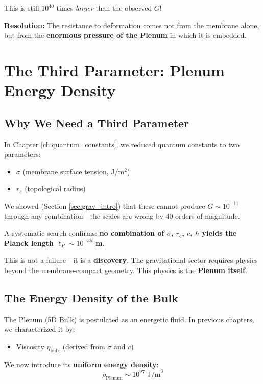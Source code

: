 This is still $10^{40}$ times \textit{larger} than the observed $G$!

\textbf{Resolution:} The resistance to deformation comes not from the membrane alone, but from the \textbf{enormous pressure of the Plenum} in which it is embedded.

\newpage

\section{The Third Parameter: Plenum Energy Density}
\label{sec:third_parameter}

\subsection{Why We Need a Third Parameter}

In Chapter \ref{ch:quantum_constants}, we reduced quantum constants to two parameters:
\begin{itemize}
    \item $\sigma$ (membrane surface tension, J/m$^2$)
    \item $r_e$ (topological radius)
\end{itemize}

We showed (Section \ref{sec:grav_intro}) that these cannot produce $G \sim 10^{-11}$ through any combination—the scales are wrong by 40 orders of magnitude.

A systematic search confirms: \textbf{no combination of $\sigma$, $r_e$, $c$, $\hbar$ yields the Planck length $\ell_P \sim 10^{-35}$ m}.

This is not a failure—it is a \textbf{discovery}. The gravitational sector requires physics beyond the membrane-compact geometry. This physics is the \textbf{Plenum itself}.

\subsection{The Energy Density of the Bulk}

The Plenum (5D Bulk) is postulated as an energetic fluid. In previous chapters, we characterized it by:
\begin{itemize}
    \item Viscosity $\eta_{\text{bulk}}$ (derived from $\sigma$ and $c$)
\end{itemize}

We now introduce its \textbf{uniform energy density}:
\begin{equation}
\rho_{\text{Plenum}} \sim 10^{97} \text{ J/m}^3
\end{equation}

